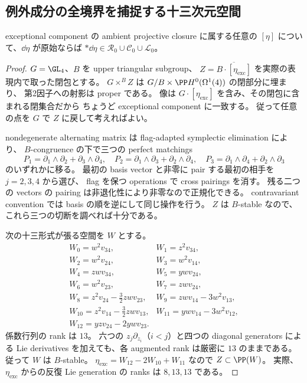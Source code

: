 \subsection{例外成分の全境界を捕捉する十三次元空間}

\begin{proposition}[例外成分の全原始切断]
\label{prop:exceptional-full-primitive}
exceptional component の ambient projective closure に属する任意の
$[\eta]$ について、$\dd\eta$ が原始ならば
$*\dd\eta\in\mathcal R_0\cup\mathcal C_0\cup\mathcal L_0$。
\end{proposition}

\begin{proof}
$G=\GL_4$、$B$ を upper triangular subgroup、
$Z=\overline{B\cdot[\eta_{\mathrm{exc}}]}$ を実際の表現内で取った閉包とする。
$G\times^B Z$ は $G/B\times\PP H^0(\Omega^1(4))$ の閉部分に埋まり、
第2因子への射影は proper である。
像は $G\cdot[\eta_{\mathrm{exc}}]$ を含み、その閉包に含まれる閉集合だから
ちょうど exceptional component に一致する。
従って任意の点を $G$ で $Z$ に戻して考えればよい。

nondegenerate alternating matrix は flag-adapted symplectic elimination により、
$B$-congruence の下で三つの perfect matchings
\[
 P_1=\partial_1\wedge\partial_2+\partial_3\wedge\partial_4,
 \quad P_2=\partial_1\wedge\partial_3+\partial_2\wedge\partial_4,
 \quad P_3=\partial_1\wedge\partial_4+\partial_2\wedge\partial_3
 \tag{Z13}
\]
のいずれかに移る。
最初の basis vector と非零に pair する最初の相手を $j=2,3,4$ から選び、
flag を保つ operations で cross pairings を消す。
残る二つの vectors の pairing は非退化性により非零なので正規化できる。
contravariant convention では basis の順を逆にして同じ操作を行う。
$Z$ は $B$-stable なので、これら三つの切断を調べれば十分である。

次の十三形式が張る空間を $W$ とする。
\[
\begin{array}{ll}
 W_0=w^2v_{34},&W_1=z^2v_{34},\\
 W_2=w^2v_{24},&W_3=w^2v_{14},\\
 W_4=zwv_{34},&W_5=ywv_{24},\\
 W_6=w^2v_{23},&W_7=zwv_{24},\\
 W_8=z^2v_{24}-\tfrac32zwv_{23},&
 W_9=zwv_{14}-3w^2v_{13},\\
 W_{10}=z^2v_{14}-\tfrac32zwv_{13},&
 W_{11}=ywv_{14}-3w^2v_{12},\\
 W_{12}=yzv_{24}-2ywv_{23}.&
\end{array}\tag{Z14}
\]
係数行列の rank は $13$。
六つの $z_j\partial_{z_i}$（$i<j$）と四つの diagonal generators による
Lie derivatives を加えても、各 augmented rank は厳密に $13$ のままである。
従って $W$ は $B$-stable。
$\eta_{\mathrm{exc}}=W_{12}-2W_{10}+W_{11}$ なので $Z\subset\PP(W)$。
実際、$\eta_{\mathrm{exc}}$ からの反復 Lie generation の ranks は $8,13,13$ である。


\end{proof}
